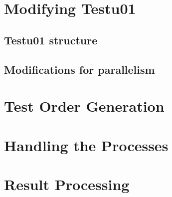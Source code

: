 \section{Modifying Testu01}
\subsection{Testu01 structure}

\subsection{Modifications for parallelism}

\section{Test Order Generation}

\section{Handling the Processes}

\section{Result Processing}
